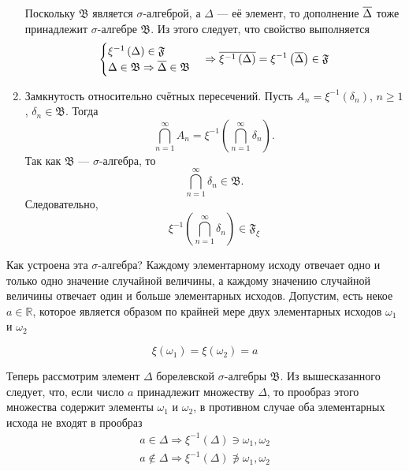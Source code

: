 \begin{enumerate}
      Поскольку $\mathfrak{B}$ является $\sigma$-алгеброй,
      а $\Delta$ --- её элемент,
      то дополнение $\overline{\Delta}$ тоже принадлежит
      $\sigma$-алгебре $\mathfrak{B}$.
      Из этого следует, что свойство выполняется
      \begin{align*}
      \begin{cases}
          \xi^{-1}\left( \Delta \right) \in \mathfrak{F}\\
          \Delta \in \mathfrak{B}
        \Rightarrow \overline{\Delta} \in \mathfrak{B}
      \end{cases}
      \Rightarrow
      \overline{\xi^{-1}\left( \Delta \right)}
          = \xi^{-1}\left( \overline{\Delta} \right) \in \mathfrak{F}
      \end{align*}
  \item Замкнутость относительно счётных пересечений.
    Пусть $A_n = \xi^{-1}\left( \delta_n \right)$, $n \ge 1$,
    $\delta_n \in \mathfrak{B}$.
    Тогда
    \begin{equation*}
      \bigcap_{n=1}^{\infty} A_n
      = \xi^{-1}\left( \bigcap_{n=1}^{\infty} \delta_n \right).
    \end{equation*}
    Так как $\mathfrak{B}$ --- $\sigma$-алгебра, то
    \begin{equation*}
      \bigcap_{n=1}^{\infty} \delta_n \in \mathfrak{B}.
    \end{equation*}
    Следовательно,
    \begin{equation*}
      \xi^{-1}\left( \bigcap_{n=1}^{\infty} \delta_n \right)
      \in \mathfrak{F}_{\xi}
    \end{equation*}
\end{enumerate}

Как устроена эта $\sigma$-алгебра?
Каждому элементарному исходу отвечает одно и только одно значение
случайной величины, а каждому значению случайной величины
отвечает один и больше элементарных исходов.
Допустим, есть некое $a\in\mathbb{R}$, которое является образом по крайней мере
двух элементарных исходов $\omega_1$ и $\omega_2$

$$\xi\left( \omega_1 \right) = \xi\left( \omega_2 \right) = a$$

Теперь рассмотрим элемент $\Delta$ борелевской $\sigma$-алгебры $\mathfrak{B}$.
Из вышесказанного следует, что,
если число $a$ принадлежит множеству $\Delta$, то прообраз этого множества
содержит элементы $\omega_1$ и $\omega_2$,
в противном случае оба элементарных исхода не входят в прообраз
\begin{align*}
  a \in \Delta
      \Rightarrow \xi^{-1}\left( \Delta \right) \ni \omega_1, \omega_2 \\
  a \notin \Delta
      \Rightarrow \xi^{-1}\left( \Delta \right) \not\ni \omega_1, \omega_2 \\
\end{align*}

